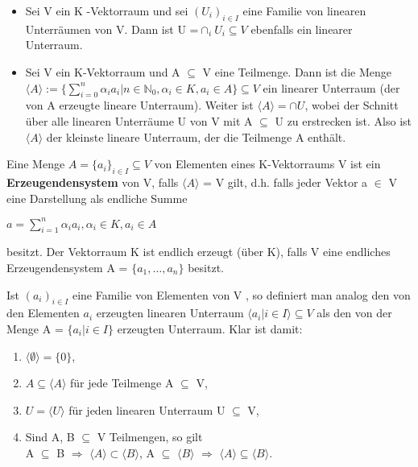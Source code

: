 \begin{remark}
\begin{itemize}
\item Sei V ein K -Vektorraum und sei $(U_i )_{i \in I}$ eine Familie von linearen Unterräumen von V. Dann ist U =$\cap_i U_i \subseteq V$ ebenfalls ein linearer Unterraum.
\item Sei V ein K-Vektorraum und A $\subseteq$ V eine Teilmenge. Dann ist die Menge $\langle A \rangle := \big\{ \sum\nolimits_{i=0}^{n} \alpha_i a_i | n \in \mathbb{N}_0, \alpha_i \in K, a_i \in A \big\} \subseteq V$ ein linearer Unterraum (der von A erzeugte lineare Unterraum). Weiter ist $\langle A \rangle = \cap U$, wobei der Schnitt über alle linearen Unterräume U von V mit A $\subseteq$ U zu erstrecken ist. Also ist $\langle A \rangle$ der kleinste lineare Unterraum, der die Teilmenge A enthält.
\end{itemize}
\end{remark}

\begin{definition}
Eine Menge $A = \{a_i\}_{i \in I} \subseteq V$ von Elementen eines K-Vektorraums V ist ein \textbf{Erzeugendensystem} von V, falls $\langle A \rangle$ = V gilt, d.h. falls jeder Vektor a $\in$ V eine Darstellung als endliche Summe
\begin{center}
$a = \sum\nolimits_{i=1}^{n}\alpha_i a_i, \alpha_i \in K, a_i \in A$
\end{center}
besitzt. Der Vektorraum K ist endlich erzeugt (über K), falls V eine endliches Erzeugendensystem A = $\{a_1, …, a_n\}$ besitzt.
\end{definition}

\begin{remark} 
Ist $(a_i)_{i \in I}$ eine Familie von Elementen von V , so definiert man analog den von den Elementen $a_i$ erzeugten linearen Unterraum $\langle a_i | i \in I \rangle \subseteq V$ als den von der Menge A = $\{a_i | i \in I\}$ erzeugten Unterraum. Klar ist 
damit:
\begin{enumerate}
\item $\langle \emptyset \rangle = \{0\}$,
\item $A \subseteq \langle A \rangle$ für jede Teilmenge A $\subseteq$ V, 
\item $U = \langle U \rangle$ für jeden linearen Unterraum U $\subseteq$ V, 
\item Sind A, B $\subseteq$ V Teilmengen, so gilt\\ 
A $\subseteq$ B $\Rightarrow$ $\langle A \rangle \subset \langle B \rangle$, \hspace*{3mm}
A $\subseteq$ $\langle B \rangle$ $\Rightarrow$ $\langle A \rangle \subseteq \langle B \rangle$.
\end{enumerate} 
\end{remark}

